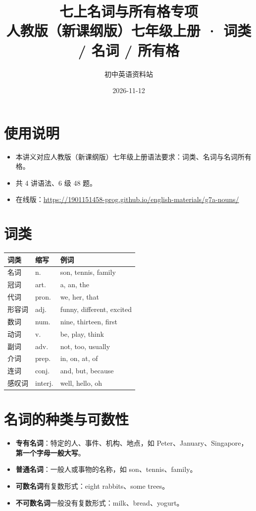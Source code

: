 \documentclass[11pt,a4paper]{ctexart}
\title{\textbf{七上名词与所有格专项}\\[4pt]
\large 人教版（新课纲版）七年级上册 · 词类 / 名词 / 所有格}
\author{初中英语资料站}
\date{2026-11-12}
\begin{document}
\maketitle

\section*{使用说明}
\begin{itemize}[leftmargin=1.4em]
\item 本讲义对应人教版（新课纲版）七年级上册语法要求：词类、名词与名词所有格。
\item 共 4 讲语法、6 级 48 题。
\item 在线版：\url{https://1901151458-prog.github.io/english-materials/g7a-nouns/}
\end{itemize}

\section{词类}
\begin{center}
\begin{tabular}{p{3.4cm}p{2.4cm}p{7.6cm}}
\hline
\textbf{词类} & \textbf{缩写} & \textbf{例词}\\
\hline
名词 & n. & son, tennis, family\\
冠词 & art. & a, an, the\\
代词 & pron. & we, her, that\\
形容词 & adj. & funny, different, excited\\
数词 & num. & nine, thirteen, first\\
动词 & v. & be, play, think\\
副词 & adv. & not, too, usually\\
介词 & prep. & in, on, at, of\\
连词 & conj. & and, but, because\\
感叹词 & interj. & well, hello, oh\\
\hline
\end{tabular}
\end{center}

\section{名词的种类与可数性}
\begin{itemize}[leftmargin=1.4em]
\item \textbf{专有名词}：特定的人、事件、机构、地点，如 Peter、January、Singapore，\textbf{第一个字母一般大写}。
\item \textbf{普通名词}：一般人或事物的名称，如 son、tennis、family。
\item \textbf{可数名词}有复数形式：eight rabbits、some trees。
\item \textbf{不可数名词}一般没有复数形式：milk、bread、yogurt。
\end{itemize}
\end{document}
